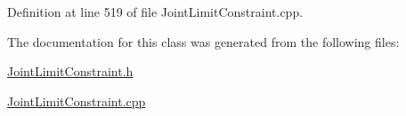 Definition at line 519 of file Joint\+Limit\+Constraint.\+cpp.



The documentation for this class was generated from the following files\+:\begin{DoxyCompactItemize}
\item 
\hyperlink{JointLimitConstraint_8h}{Joint\+Limit\+Constraint.\+h}\item 
\hyperlink{JointLimitConstraint_8cpp}{Joint\+Limit\+Constraint.\+cpp}\end{DoxyCompactItemize}
